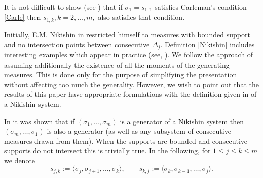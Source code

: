 \documentclass[10pt,a4paper]{article}
\theoremstyle{definition}
\theoremstyle{remark}
\numberwithin{equation}{section}
\begin{document}
It is not difficult to show (see \cite[Theorem 1.5]{LM}) that if $\sigma_1 = s_{1,1}$ satisfies Carleman's condition \eqref{Carle} then $s_{1,k}, k=2,\ldots,m,$ also satisfies that condition.

Initially, E.M. Nikishin in \cite{Nik}  restricted himself to measures with bounded support and no intersection points between consecutive $\Delta_j$.
Definition \ref{Nikishin} includes interesting examples  which appear in practice (see, \cite[Subsection 1.4]{FL4II}). We follow the approach of \cite[Definition 1.2]{FL4II}  assuming additionally the existence of all the moments of the generating measures. This is done only for the purpose of simplifying the presentation without affecting too much the generality. However, we wish to point out that the results of this paper have appropriate formulations with the definition given in \cite{FL4II} of a Nikishin system.

In \cite[Lemma 2.9]{FL4II} it was shown that if $(\sigma_1,\ldots,\sigma_m)$ is a generator of a Nikishin system then $(\sigma_m,\ldots,\sigma_1)$ is also a generator (as well as any subsystem of consecutive measures drawn from them). When the supports are bounded and consecutive supports do not intersect this is trivially true. In the following, for $1\leq j\leq k\leq m$ we denote
\[ s_{j,k} := \langle \sigma_j,\sigma_{j+1},\ldots,\sigma_k \rangle, \qquad s_{k,j} := \langle \sigma_k,\sigma_{k-1},\ldots,\sigma_j \rangle.
\]
\end{document}
